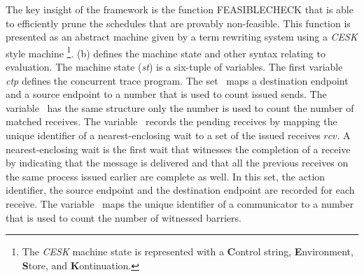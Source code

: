 The key insight of the framework is the function \textrm{FEASIBLECHECK} that is able to efficiently prune the schedules that are provably non-feasible. This function is presented as an abstract machine given by a term rewriting system using a \textit{CESK} style machine \footnote{The \textit{CESK} machine state is represented with a \textbf{C}ontrol string, \textbf{E}nvironment, \textbf{S}tore, and \textbf{K}ontinuation.}. (b) defines the machine state and other syntax relating to evaluation. The machine state (\textit{st}) is a six-tuple of variables. The first variable \textit{ctp} defines the concurrent trace program. The set \epsnd\ maps a destination endpoint and a source endpoint to a number that is used to count issued sends. The variable \eprcv\ has the same structure only the number is used to count the number of matched receives. The variable \epwait\ records the pending receives by mapping the unique identifier of a nearest-enclosing wait to a set of the issued receives $\mathit{rcv}$. A nearest-enclosing wait is the first wait that witnesses the completion of a receive by indicating that the message is delivered and that all the previous receives on the same process issued earlier are complete as well. In this set, the action identifier, the source endpoint and the destination endpoint are recorded for each receive. The variable \epbarrier\ maps the unique identifier of a communicator to a number that is used to count the number of witnessed barriers.


